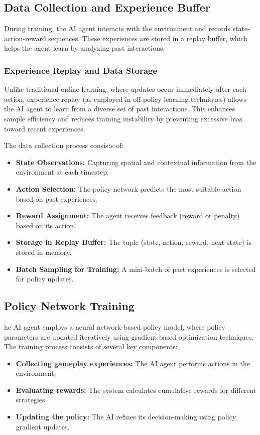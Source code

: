 \documentclass[12pt,oneside,openright,a4paper]{cpe-english-project}
\begin{document}
\subsection{Data Collection and Experience Buffer}
During training, the AI agent interacts with the environment and records state-action-reward sequences. These experiences are stored in a replay buffer, which helps the agent learn by analyzing past interactions.\par
\subsubsection{Experience Replay and Data Storage}
Unlike traditional online learning, where updates occur immediately after each action, experience replay (as employed in off-policy learning techniques) allows the AI agent to learn from a diverse set of past interactions. This enhances sample efficiency and reduces training instability by preventing excessive bias toward recent experiences.\par The data collection process consists of:
\begin{itemize}
\item \textbf{State Observations:} Capturing spatial and contextual information from the environment at each timestep.
\item \textbf{Action Selection:} The policy network predicts the most suitable action based on past experiences.
\item \textbf{Reward Assignment:} The agent receives feedback (reward or penalty) based on its action.
\item \textbf{Storage in Replay Buffer:} The tuple (state, action, reward, next state) is stored in memory.
\item \textbf{Batch Sampling for Training:} A mini-batch of past experiences is selected for policy updates.
\end{itemize}
\subsection{Policy Network Training}
he AI agent employs a neural network-based policy model, where policy parameters are updated iteratively using gradient-based optimization techniques. The training process consists of several key components:
\begin{itemize}
\item  \textbf{Collecting gameplay experiences:} The AI agent performs actions in the environment.
\item  \textbf{Evaluating rewards:} The system calculates cumulative rewards for different strategies.
\item  \textbf{Updating the policy:} The AI refines its decision-making using policy gradient updates.
\end{itemize}
\end{document}
